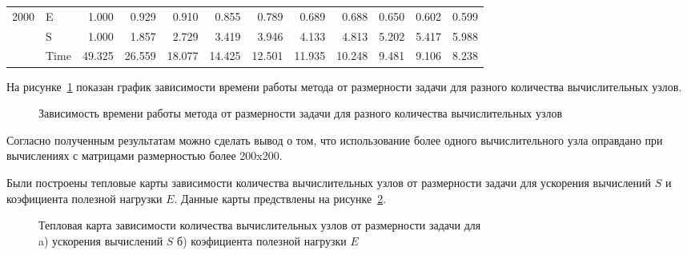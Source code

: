 \begin{table}[H]
\begin{tabular}{|l|l|rrrrrrrrrr|}
        \cline{1-12}
        \multirow[t]{3}{*}{2000} & E    & 1.000  & 0.929  & 0.910  & 0.855  & 0.789  & 0.689  & 0.688  & 0.650 & 0.602 & 0.599 \\
        & S    & 1.000  & 1.857  & 2.729  & 3.419  & 3.946  & 4.133  & 4.813  & 5.202 & 5.417 & 5.988 \\
        & Time & 49.325 & 26.559 & 18.077 & 14.425 & 12.501 & 11.935 & 10.248 & 9.481 & 9.106 & 8.238 \\
        \cline{1-12}
        \hline
    \end{tabular}
\end{table}


На рисунке~\ref{fig:graph} показан график зависимости времени работы метода от размерности задачи для разного количества вычислительных узлов.

\begin{figure}[H]
    \centering
    
    \caption{Зависимость времени работы метода от размерности задачи для разного количества вычислительных узлов}
    \label{fig:graph}
\end{figure}

Согласно полученным результатам можно сделать вывод о том, что использование более одного вычислительного узла оправдано при вычислениях с матрицами размерностью более 200x200.


Были построены тепловые карты зависимости количества вычислительных узлов от размерности задачи для ускорения вычислений $S$ и коэфициента полезной нагрузки $E$.
Данные карты предствлены на рисунке~\ref{fig:heatmap_s}.

\begin{figure}[H]
    \centering
    \begin{minipage}[h]{0.49\textwidth}
    \end{minipage}
    \hfill
    \begin{minipage}[h]{0.49\textwidth}
    \end{minipage}
    \caption{Тепловая карта зависимости количества вычислительных узлов от размерности задачи для \\ a) ускорения вычислений  $S$  б) коэфициента полезной нагрузки  $E$   }
    \label{fig:heatmap_s}
\end{figure}



